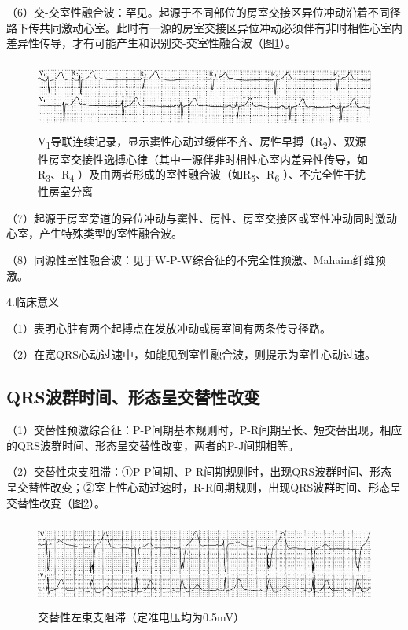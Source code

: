 （6）交-交室性融合波：罕见。起源于不同部位的房室交接区异位冲动沿着不同径路下传共同激动心室。此时有一源的房室交接区异位冲动必须伴有非时相性心室内差异性传导，才有可能产生和识别交-交室性融合波（图\ref{fig3-20}）。

\begin{figure}[!htbp]
 \centering
 \includegraphics[width=5.58333in,height=0.90625in]{./images/Image00070.jpg}
 \captionsetup{justification=centering}
 \caption{V\textsubscript{1}导联连续记录，显示窦性心动过缓伴不齐、房性早搏（R\textsubscript{2}）、双源性房室交接性逸搏心律（其中一源伴非时相性心室内差异性传导，如R\textsubscript{3}、R\textsubscript{4} ）及由两者形成的室性融合波（如R\textsubscript{5}、R\textsubscript{6} ）、不完全性干扰性房室分离}
 \label{fig3-20}
  \end{figure} 


（7）起源于房室旁道的异位冲动与窦性、房性、房室交接区或室性冲动同时激动心室，产生特殊类型的室性融合波。

（8）同源性室性融合波：见于W-P-W综合征的不完全性预激、Mahaim纤维预激。

4.临床意义

（1）表明心脏有两个起搏点在发放冲动或房室间有两条传导径路。

（2）在宽QRS心动过速中，如能见到室性融合波，则提示为室性心动过速。

\protect\hypertarget{text00009.htmlux5cux23subid62}{}{}

\subsection{QRS波群时间、形态呈交替性改变}

（1）交替性预激综合征：P-P间期基本规则时，P-R间期呈长、短交替出现，相应的QRS波群时间、形态呈交替性改变，两者的P-J间期相等。

（2）交替性束支阻滞：①P-P间期、P-R间期规则时，出现QRS波群时间、形态呈交替性改变；②室上性心动过速时，R-R间期规则，出现QRS波群时间、形态呈交替性改变（图\ref{fig3-21}）。

\begin{figure}[!htbp]
 \centering
 \includegraphics[width=5.58333in,height=1.11458in]{./images/Image00071.jpg}
 \captionsetup{justification=centering}
 \caption{交替性左束支阻滞（定准电压均为0.5mV）}
 \label{fig3-21}
  \end{figure} 

